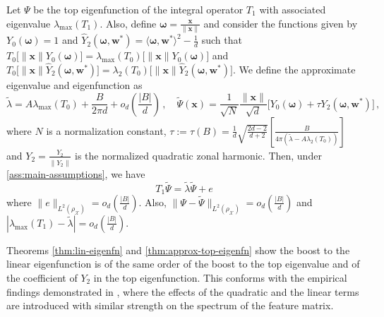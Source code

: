\begin{theorem}\label{thm:approx-top-eigenfn}
    Let $\Psi$ be the top eigenfunction of the integral operator $T_1$ with associated eigenvalue $\lambda_{\max}(T_1)$. Also, define $\bm \omega = \frac{\bm x}{\|\bm x\|}$ and consider the functions given by $Y_0(\bm \omega) = 1$ and $\hat{Y}_2(\bm \omega, \bm w^*) = \langle \bm \omega, \bm w^*\rangle^2 - \frac{1}{d}$ such that $T_0 \Big[\|\bm x\| Y_0(\bm \omega)\Big] = \lambda_{\max}(T_0)\Big[\|\bm x\| Y_0(\bm \omega)\Big]$ and $T_0 \Big[\|\bm x\| \hat{Y}_2(\bm \omega, \bm w^*)\Big] = \lambda_{2}(T_0)\Big[\|\bm x\| \hat{Y}_2(\bm \omega, \bm w^*)\Big]$. We define the approximate eigenvalue and eigenfunction as
    \begin{equation}\label{eq:approx-top-eigenfn}
        \tilde{\lambda} = A\lambda_{\max}(T_0) + \frac{B}{2\pi d} + o_d\left(\frac{|B|}{d}\right) \,, \quad     
        \tilde{\Psi}(\bm x) = \frac{1}{\sqrt{N}}\frac{\|\bm x\|}{\sqrt d}\Big[ Y_0(\bm \omega)+ \tau Y_2(\bm \omega, \bm w^*) \Big] \, ,
    \end{equation}
    where $N$ is a normalization constant, $\tau := \tau(B) = \frac{1}{d}\sqrt{\frac{2d - 2}{d+2}}\left[\frac{B}{4 \pi (\tilde{\lambda} -A\lambda_2(T_0))}\right]$ and $Y_2 = \frac{\hat{Y}_2}{\| \hat{Y}_2 \|}$ is the normalized quadratic zonal harmonic.
    Then, under \cref{ass:main-assumptions}, we have 
    \[
        T_1\tilde{\Psi} = \tilde{\lambda}\tilde{\Psi} + e
    \] where $\|e\|_{L^2(\rho_{\mathcal X})} = o_d\left(\frac{|B|}{d}\right)$.
    Also, $\|\Psi - \tilde{\Psi}\|_{L^2(\rho_{\mathcal X})}  = o_d\left(\frac{|B|}{d}\right)$ and $|\lambda_{\max}(T_1) - \tilde{\lambda}| = o_d\left(\frac{|B|}{d}\right)$.
\end{theorem}
\begin{remark}
    {Theorems \ref{thm:lin-eigenfn} and \ref{thm:approx-top-eigenfn} show the boost to the linear eigenfunction is of the same order of the boost to the top eigenvalue and of the coefficient of $Y_2$ in the top eigenfunction. This conforms with the empirical findings demonstrated in \cite{moniri2023theory}, where the effects of the quadratic and the linear terms are introduced with similar strength on the spectrum of the feature matrix.}
\end{remark}
